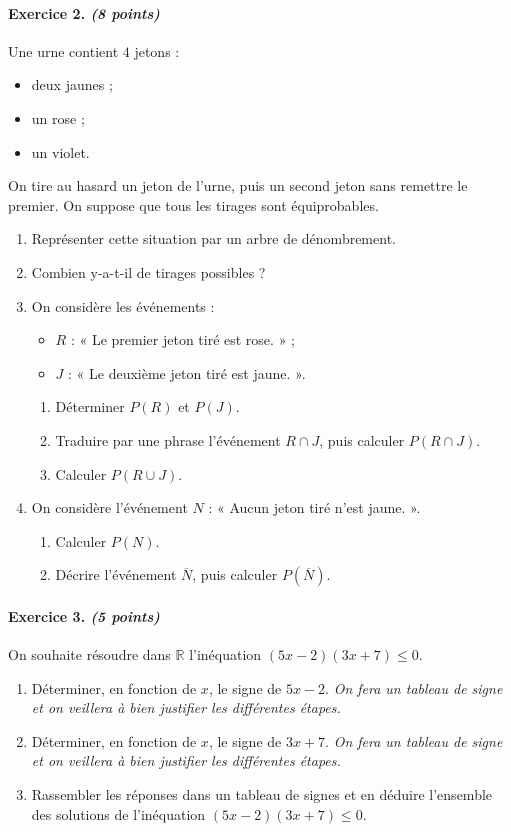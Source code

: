\documentclass[11pt]{article}
\begin{document}
\paragraph{Exercice 2. \emph{(8 points)}}
Une urne contient $4$ jetons :
\begin{itemize}
  \item deux jaunes ;
  \item un rose ;
  \item un violet.
\end{itemize}
On tire au hasard un jeton de l'urne, puis un second jeton sans remettre le
premier. On suppose que tous les tirages sont équiprobables.
\begin{enumerate}
  \item Représenter cette situation par un arbre de dénombrement.
  \item Combien y-a-t-il de tirages possibles ?
  \item On considère les événements :
    \begin{itemize}
      \item $R$ : « Le premier jeton tiré est rose. » ;
      \item $J$ : « Le deuxième jeton tiré est jaune. ».
    \end{itemize}
    \begin{enumerate}
      \item Déterminer $P(R)$ et $P(J)$.
      \item Traduire par une phrase l'événement $R\cap J$, puis calculer
        $P(R\cap J)$.
      \item Calculer $P(R\cup J)$.
    \end{enumerate}
  \item On considère l'événement $N$ : « Aucun jeton tiré n'est jaune. ».
    \begin{enumerate}
      \item Calculer $P(N)$.
      \item Décrire l'événement $\overline N$, puis calculer $P\left( \overline
        N\right)$.
    \end{enumerate}
\end{enumerate}

\paragraph{Exercice 3. \emph{(5 points)}}
On souhaite résoudre dans $\mathbb{R}$ l'inéquation $(5x-2)(3x+7)\leq0$.
\begin{enumerate}
  \item Déterminer, en fonction de $x$, le signe de $5x-2$. \emph{On fera un
    tableau de signe et on veillera à bien justifier les différentes étapes.}
  \item Déterminer, en fonction de $x$, le signe de $3x+7$. \emph{On fera un
    tableau de signe et on veillera à bien justifier les différentes étapes.}
  \item Rassembler les réponses dans un tableau de signes et en déduire
    l'ensemble des solutions de l'inéquation $(5x-2)(3x+7)\leq0$.
\end{enumerate}
\end{document}
